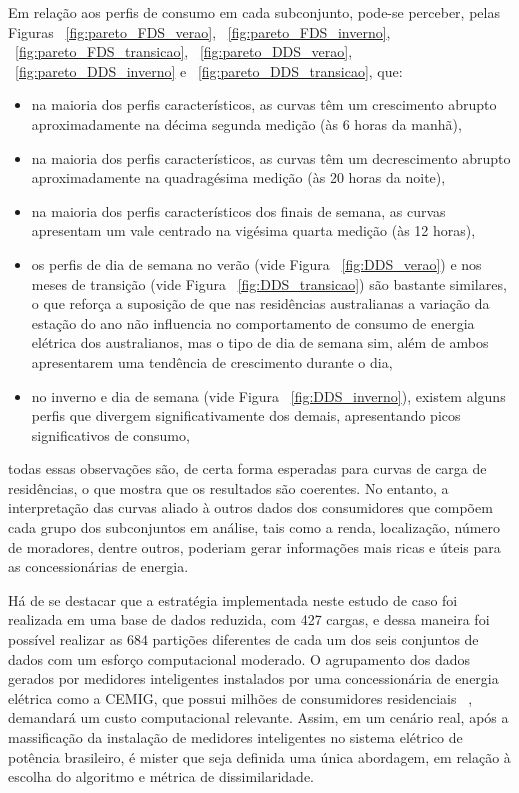 Em relação aos perfis de consumo em cada subconjunto, pode-se perceber, pelas Figuras  ~\ref{fig:pareto_FDS_verao}, ~\ref{fig:pareto_FDS_inverno}, ~\ref{fig:pareto_FDS_transicao}, ~\ref{fig:pareto_DDS_verao}, ~\ref{fig:pareto_DDS_inverno} e ~\ref{fig:pareto_DDS_transicao}, que:
\begin{itemize}
	\item na maioria dos perfis característicos, as curvas têm um crescimento abrupto aproximadamente na décima segunda medição (às 6 horas da manhã),
	\item na maioria dos perfis característicos, as curvas têm um decrescimento abrupto aproximadamente na quadragésima medição (às 20 horas da noite),
	\item na maioria dos perfis característicos dos finais de semana, as curvas apresentam um vale centrado na vigésima quarta medição (às 12 horas),
	\item os perfis de dia de semana no verão (vide Figura ~\ref{fig:DDS_verao}) e nos meses de transição (vide Figura ~\ref{fig:DDS_transicao}) são bastante similares, o que reforça a suposição de que nas residências australianas a variação da estação do ano não influencia no comportamento de consumo de energia elétrica dos australianos, mas o tipo de dia de semana sim, além de ambos apresentarem uma tendência de crescimento durante o dia,
	\item no inverno e dia de semana (vide Figura ~\ref{fig:DDS_inverno}), existem alguns perfis que divergem significativamente dos demais, apresentando picos significativos de consumo,
\end{itemize}
todas essas observações são, de certa forma esperadas para curvas de carga de residências, o que mostra que os resultados são coerentes. No entanto, a interpretação das curvas aliado à outros dados dos consumidores que compõem cada grupo dos subconjuntos em análise, tais como a renda, localização, número de moradores, dentre outros, poderiam gerar informações mais ricas e úteis para as concessionárias de energia.

Há de se destacar que a estratégia implementada neste estudo de caso foi realizada em uma base de dados reduzida, com 427 cargas, e dessa maneira foi possível realizar as $684$ partições diferentes de cada um dos seis conjuntos de dados com um esforço computacional moderado. O agrupamento dos dados gerados por medidores inteligentes instalados por uma concessionária de energia elétrica como a CEMIG, que possui milhões de consumidores residenciais ~\parencite{DadosCemig}, demandará um custo computacional relevante. Assim, em um cenário real, após a massificação da instalação de medidores inteligentes no sistema elétrico de potência brasileiro, é mister que seja definida uma única abordagem, em relação à escolha do algoritmo e métrica de dissimilaridade.

